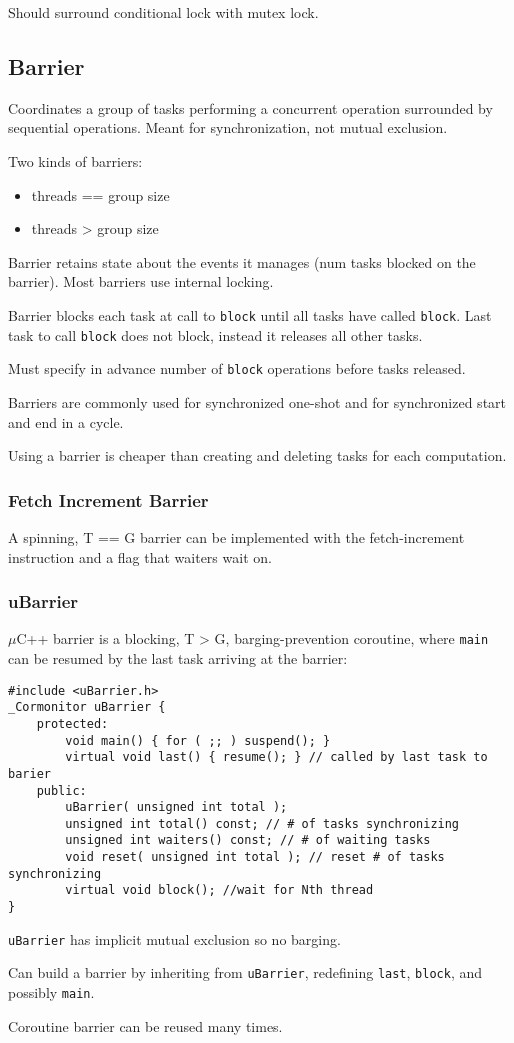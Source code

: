 \documentclass[11pt]{article}
\begin{document}
Should surround conditional lock with mutex lock.
\subsection{Barrier}
\label{sec:org9684358}
Coordinates a group of tasks performing a concurrent operation surrounded by sequential
operations.
Meant for synchronization, not mutual exclusion.

Two kinds of barriers:
\begin{itemize}
\item threads == group size
\item threads > group size
\end{itemize}

Barrier retains state about the events it manages (num tasks blocked on the barrier).
Most barriers use internal locking.

Barrier blocks each task at call to \texttt{block} until all tasks have called \texttt{block}.
Last task to call \texttt{block} does not block, instead it releases all other tasks.

Must specify in advance number of \texttt{block} operations before tasks released.

Barriers are commonly used for synchronized one-shot and for synchronized start
and end in a cycle.

Using a barrier is cheaper than creating and deleting tasks for each computation.
\subsubsection{Fetch Increment Barrier}
\label{sec:org8ae4f6e}
A spinning, T == G barrier can be implemented with the fetch-increment instruction
and a flag that waiters wait on.
\subsubsection{uBarrier}
\label{sec:orgbb2bac6}
\(\mu\)C++ barrier is a blocking, T > G, barging-prevention coroutine, where \texttt{main}
can be resumed by the last task arriving at the barrier:
\begin{verbatim}
#include <uBarrier.h>
_Cormonitor uBarrier {
    protected:
        void main() { for ( ;; ) suspend(); }
        virtual void last() { resume(); } // called by last task to barier
    public:
        uBarrier( unsigned int total );
        unsigned int total() const; // # of tasks synchronizing
        unsigned int waiters() const; // # of waiting tasks
        void reset( unsigned int total ); // reset # of tasks synchronizing
        virtual void block(); //wait for Nth thread
}
\end{verbatim}

\texttt{uBarrier} has implicit mutual exclusion so no barging.

Can build a barrier by inheriting from \texttt{uBarrier}, redefining \texttt{last}, \texttt{block},
and possibly \texttt{main}.

Coroutine barrier can be reused many times.
\end{document}
